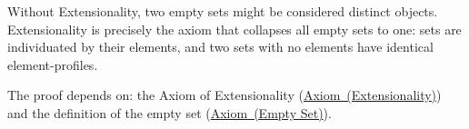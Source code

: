\begin{remark*}
Without Extensionality, two empty sets might be considered distinct objects.
Extensionality is precisely the axiom that collapses all empty sets to one: sets
are individuated by their elements, and two sets with no elements have identical
element-profiles.
\end{remark*}

\begin{remark*}[Dependencies]
The proof depends on: the Axiom of Extensionality
(\hyperref[ax:zf-extensionality]{Axiom~(Extensionality)}) and the definition of
the empty set (\hyperref[ax:zf-empty-set]{Axiom~(Empty Set)}).
\end{remark*}


